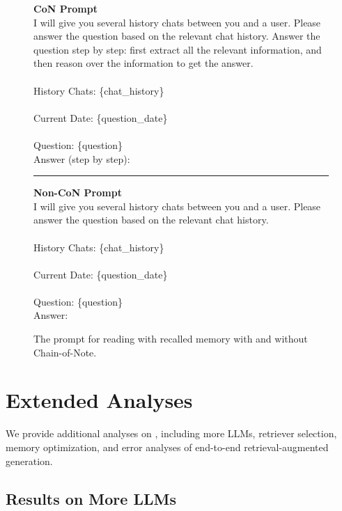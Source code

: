 \begin{figure}[h!]
    \begin{tcolorbox}

    \textbf{CoN Prompt} \\

    I will give you several history chats between you and a user. Please answer the question based on the relevant chat history. Answer the question step by step: first extract all the relevant information, and then reason over the information to get the answer. \\\\History Chats: \{chat\_history\}\\\\Current Date: \{question\_date\}\\\\Question: \{question\}\\Answer (step by step):
    \\

    \hrule
    \bigskip
    
    \textbf{Non-CoN Prompt} \\

    I will give you several history chats between you and a user. Please answer the question based on the relevant chat history.\\\\History Chats: \{chat\_history\}\\\\Current Date: \{question\_date\}\\\\Question: \{question\}\\Answer:
    
    \end{tcolorbox}
    \caption{The prompt for reading with recalled memory with and without Chain-of-Note.}
    \label{fig:reading-prompt}
\end{figure}


\clearpage
\section{Extended Analyses}

We provide additional analyses on \BENCHMARK{}, including more LLMs, retriever selection, memory optimization, and error analyses of end-to-end retrieval-augmented generation.

\subsection{Results on More LLMs}
\label{appendix-more-llm-results}

